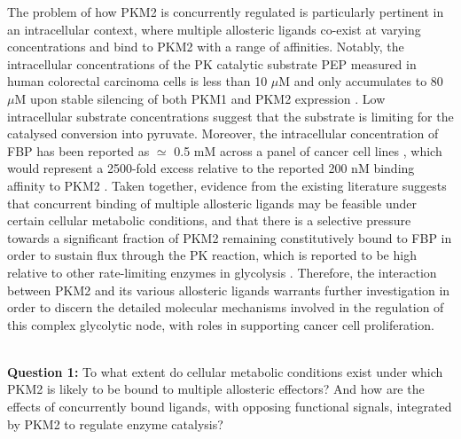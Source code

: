 The problem of how PKM2 is concurrently regulated is particularly pertinent in an intracellular context, where multiple allosteric ligands co-exist at varying concentrations and bind to PKM2 with a range of affinities. Notably, the intracellular concentrations of the PK catalytic substrate PEP measured in human colorectal carcinoma cells is less than 10 $\mu$M and only accumulates to 80 $\mu$M upon stable silencing of both PKM1 and PKM2 expression \cite{Chaneton:2012aa}. Low intracellular substrate concentrations suggest that the substrate is limiting for the catalysed conversion into pyruvate. Moreover, the intracellular concentration of FBP has been reported as $\simeq$ 0.5 mM across a panel of cancer cell lines \cite{Xie:2016aa}, which would represent a 2500-fold excess relative to the reported 200 nM binding affinity to PKM2 \cite{Yan:2016aa}. Taken together, evidence from the existing literature suggests that concurrent binding of multiple allosteric ligands may be feasible under certain cellular metabolic conditions, and that there is a selective pressure towards a significant fraction of PKM2 remaining constitutively bound to FBP in order to sustain flux through the PK reaction, which is reported to be high relative to other rate-limiting enzymes in glycolysis \cite{Shestov:2014aa}. Therefore, the interaction between PKM2 and its various allosteric ligands warrants further investigation in order to discern the detailed molecular mechanisms involved in the regulation of this complex glycolytic node, with roles in supporting cancer cell proliferation. 
%
%
\\\\
%
%
\begin{tcolorbox}
\textbf{Question 1:} To what extent do cellular metabolic conditions exist under which PKM2 is likely to be bound to multiple allosteric effectors? And how are the effects of concurrently bound ligands, with opposing functional signals, integrated by PKM2 to regulate enzyme catalysis?
\end{tcolorbox}
%

